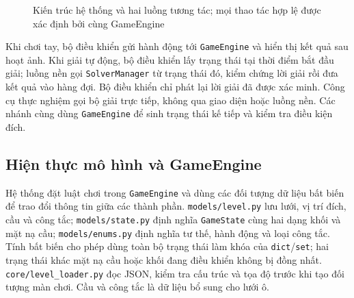 \begin{figure}[H]
{%
}
\caption{Kiến trúc hệ thống và hai luồng tương tác; mọi thao tác hợp lệ được xác định bởi cùng GameEngine}
\label{fig:system-architecture}
\end{figure}

Khi chơi tay, bộ điều khiển gửi hành động tới \texttt{GameEngine} và hiển thị
kết quả sau hoạt ảnh. Khi giải tự động, bộ điều khiển lấy trạng thái tại thời
điểm bắt đầu giải; luồng nền gọi \texttt{SolverManager} từ trạng thái đó, kiểm
chứng lời giải rồi đưa kết quả vào hàng đợi. Bộ điều khiển chỉ phát lại lời
giải đã được xác minh. Công cụ thực nghiệm gọi bộ giải trực tiếp, không qua
giao diện hoặc luồng nền. Các nhánh cùng dùng \texttt{GameEngine} để sinh
trạng thái kế tiếp và kiểm tra điều kiện đích.

\subsection{Hiện thực mô hình và GameEngine}

Hệ thống đặt luật chơi trong \texttt{GameEngine} và dùng các đối tượng dữ liệu
bất biến để trao đổi thông tin giữa các thành phần. \texttt{models/level.py}
lưu lưới, vị trí đích, cầu và công tắc; \texttt{models/state.py} định nghĩa
\texttt{GameState} cùng hai dạng khối và mặt nạ cầu; \texttt{models/enums.py}
định nghĩa tư thế, hành động và loại công tắc. Tính bất biến cho phép dùng toàn
bộ trạng thái làm khóa của \texttt{dict}/\texttt{set}; hai trạng thái khác mặt
nạ cầu hoặc khối đang điều khiển không bị đồng nhất. \texttt{core/level\_loader.py}
đọc JSON, kiểm tra cấu trúc và tọa độ trước khi tạo đối tượng màn chơi. Cầu và
công tắc là dữ liệu bổ sung cho lưới ô.

